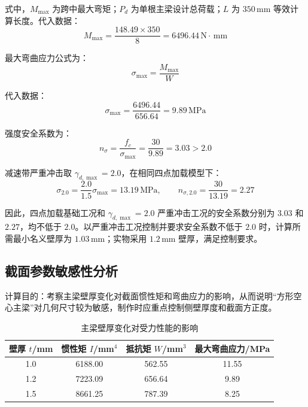 \documentclass[UTF8,a4paper,12pt,fontset=none]{ctexart}
\numberwithin{equation}{section}
\numberwithin{figure}{section}
\numberwithin{table}{section}
\newcommand{\mm}{\,\mathrm{mm}}
\newcommand{\Nunit}{\,\mathrm{N}}
\newcommand{\MPa}{\,\mathrm{MPa}}
\begin{document}
式中，$M_{\max}$ 为跨中最大弯矩；$P_d$ 为单根主梁设计总荷载；$L$ 为 $350\mm$ 等效计算长度。代入数据：
\begin{equation}
  M_{\max}=\frac{148.49\times350}{8}=6496.44\Nunit\cdot\mm
\end{equation}

最大弯曲应力公式为：
\begin{equation}
  \sigma_{\max}=\frac{M_{\max}}{W}
\end{equation}

代入数据：
\begin{equation}
  \sigma_{\max}=\frac{6496.44}{656.64}=9.89\MPa
\end{equation}

强度安全系数为：
\begin{equation}
  n_\sigma=\frac{f_c}{\sigma_{\max}}=\frac{30}{9.89}=3.03>2.0
\end{equation}

减速带严重冲击取 $\gamma_{d,\max}=2.0$，在相同四点加载模型下：
\begin{equation}
  \sigma_{2.0}=\frac{2.0}{1.5}\sigma_{\max}=13.19\MPa,
  \qquad n_{\sigma,2.0}=\frac{30}{13.19}=2.27
\end{equation}

因此，四点加载基础工况和 $\gamma_{d,\max}=2.0$ 严重冲击工况的安全系数分别为 $3.03$ 和 $2.27$，均不低于 $2.0$。以严重冲击工况控制并要求安全系数不低于 $2.0$ 时，计算所需最小名义壁厚为 $1.03\mm$；实物采用 $1.2\mm$ 壁厚，满足控制要求。

\subsection{截面参数敏感性分析}
计算目的：考察主梁壁厚变化对截面惯性矩和弯曲应力的影响，从而说明“方形空心主梁”对几何尺寸较为敏感，制作时应重点控制侧壁厚度和截面方正度。

\begin{table}[H]
\centering
\caption{主梁壁厚变化对受力性能的影响}
\label{tab:thickness-sensitivity}
\begin{tabular}{c c c c}
\toprule
\textbf{壁厚 $t$}/mm & \textbf{惯性矩 $I$}/mm$^4$ & \textbf{抵抗矩 $W$}/mm$^3$ & \textbf{最大弯曲应力}/MPa \\\midrule
1.0 & 6188.00 & 562.55 & 11.55 \\
1.2 & 7223.09 & 656.64 & 9.89 \\
1.5 & 8661.25 & 787.39 & 8.25 \\
\bottomrule
\end{tabular}
\end{table}
\end{document}
